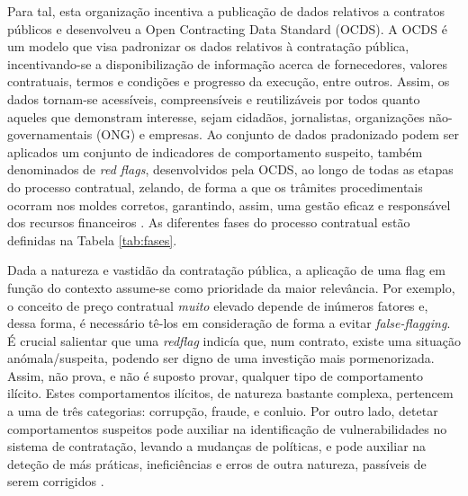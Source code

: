 Para tal, esta organização incentiva a publicação de dados relativos a contratos públicos e desenvolveu a Open Contracting Data Standard (OCDS). A OCDS é um modelo que visa padronizar os dados relativos à contratação pública, incentivando-se a disponibilização de informação acerca de fornecedores, valores contratuais, termos e condições e progresso da execução, entre outros. Assim, os dados tornam-se acessíveis, compreensíveis e reutilizáveis por todos quanto aqueles que demonstram interesse, sejam cidadãos, jornalistas, organizações não-governamentais (ONG) e empresas. Ao conjunto de dados pradonizado podem ser aplicados um conjunto de indicadores de comportamento suspeito, também denominados de \textit{red flags}, desenvolvidos pela OCDS, ao longo de todas as etapas do processo contratual, zelando, de forma a que os trâmites procedimentais ocorram nos moldes corretos, garantindo, assim, uma gestão eficaz e responsável dos recursos financeiros \cite{redflags_guide}. As diferentes fases do processo contratual estão definidas na Tabela \ref{tab:fases}.


\begin{table}[ht]
	\centering
	\renewcommand{\arraystretch}{1.2}
	\setlength{\tabcolsep}{15pt}
	\caption{Etapas do processo de contratação pública.}
	\label{tab:fases}
\end{table}


Dada a natureza e vastidão da contratação pública, a aplicação de uma flag em função do contexto assume-se como prioridade da maior relevância. Por exemplo, o conceito de preço contratual \textit{muito} elevado depende de inúmeros fatores e, dessa forma, é necessário tê-los em consideração de forma a evitar \textit{false-flagging}. É crucial salientar que uma \textit{redflag} indicía que, num contrato, existe uma situação anómala/suspeita, podendo ser digno de uma investição mais pormenorizada. Assim, não prova, e não é suposto provar, qualquer tipo de comportamento ilícito. Estes comportamentos ilícitos, de natureza bastante complexa, pertencem a uma de três categorias: corrupção, fraude, e conluio. Por outro lado, detetar comportamentos suspeitos pode auxiliar na identificação de vulnerabilidades no sistema de contratação, levando a mudanças de políticas, e pode auxiliar na deteção de más práticas, ineficiências e erros de outra natureza, passíveis de serem corrigidos \cite{redflags_guide}. 


